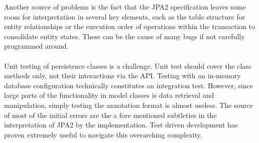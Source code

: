 Another source of problems is the fact that the JPA2 specification leaves some room for interpretation in several key elements, such as the table structure for entity relationships or the execution order of operations within the transaction to consolidate entity states. These can be the cause of many bugs if not carefully programmed around.\paragraph{}

Unit testing of persistence classes is a challenge. Unit test should cover the class methods only, not their interactions via the API. Testing with an in-memory database configuration technically constitutes an integration test. However, since large parts of the functionality in model classes is data retrieval and manipulation, simply testing the annotation format is almost useless. The source of most of the initial errors are the a fore mentioned subtleties in the interpretation of JPA2 by the implementation. Test driven development has proven extremely useful to navigate this overarching complexity.\paragraph{}
